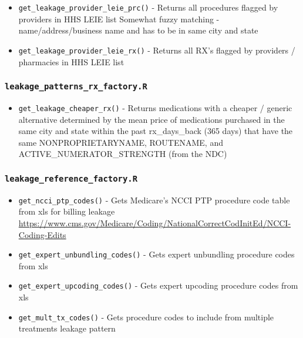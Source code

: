 \documentclass[
]{book}
\providecommand{\tightlist}{%
  \setlength{\itemsep}{0pt}\setlength{\parskip}{0pt}}
\begin{document}
\begin{itemize}
\tightlist
\item
  \texttt{get\_leakage\_provider\_leie\_prc()} - Returns all procedures flagged by providers in HHS LEIE list Somewhat fuzzy matching - name/address/business name and has to be in same city and state
\item
  \texttt{get\_leakage\_provider\_leie\_rx()} - Returns all RX's flagged by providers / pharmacies in HHS LEIE list
\end{itemize}

\hypertarget{leakage_patterns_rx_factory.r}{%
\subsubsection{\texorpdfstring{\texttt{leakage\_patterns\_rx\_factory.R}}{leakage\_patterns\_rx\_factory.R}}\label{leakage_patterns_rx_factory.r}}

\begin{itemize}
\tightlist
\item
  \texttt{get\_leakage\_cheaper\_rx()} - Returns medications with a cheaper / generic alternative determined by the mean price of medications purchased in the same city and state within the past rx\_days\_back (365 days) that have the same NONPROPRIETARYNAME, ROUTENAME, and ACTIVE\_NUMERATOR\_STRENGTH (from the NDC)
\end{itemize}

\hypertarget{leakage_reference_factory.r}{%
\subsubsection{\texorpdfstring{\texttt{leakage\_reference\_factory.R}}{leakage\_reference\_factory.R}}\label{leakage_reference_factory.r}}

\begin{itemize}
\tightlist
\item
  \texttt{get\_ncci\_ptp\_codes()} - Gets Medicare's NCCI PTP procedure code table from xls for billing leakage \url{https://www.cms.gov/Medicare/Coding/NationalCorrectCodInitEd/NCCI-Coding-Edits}
\item
  \texttt{get\_expert\_unbundling\_codes()} - Gets expert unbundling procedure codes from xls
\item
  \texttt{get\_expert\_upcoding\_codes()} - Gets expert upcoding procedure codes from xls
\item
  \texttt{get\_mult\_tx\_codes()} - Gets procedure codes to include from multiple treatments leakage pattern
\end{itemize}
\end{document}

